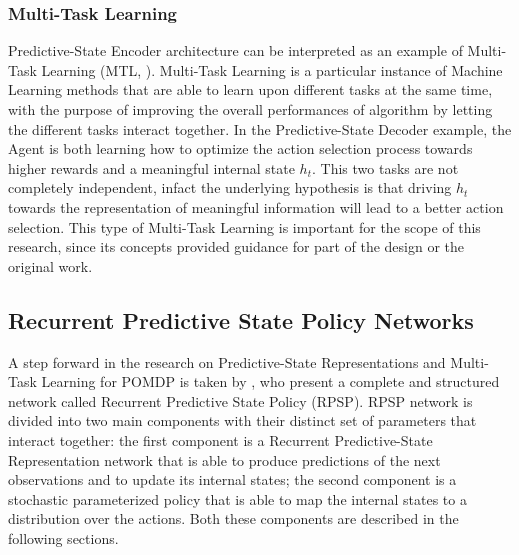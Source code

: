             \subsubsection{Multi-Task Learning}
                Predictive-State Encoder architecture can be interpreted as an example of Multi-Task Learning (MTL, ). Multi-Task Learning is a particular instance of Machine Learning methods that are able to learn upon different tasks at the same time, with the purpose of improving the overall performances of algorithm by letting the different tasks interact together. In the Predictive-State Decoder example, the Agent is both learning how to optimize the action selection process towards higher rewards and a meaningful internal state $h_t$. This two tasks are not completely independent, infact the underlying hypothesis is that driving $h_t$ towards the representation of meaningful information will lead to a better action selection. This type of Multi-Task Learning is important for the scope of this research, since its concepts provided guidance for part of the design or the original work.
        
        \newpage
        \subsection{Recurrent Predictive State Policy Networks}
        \label{subs:rpsp}
            A step forward in the research on Predictive-State Representations and Multi-Task Learning for POMDP is taken by , who present a complete and structured network called Recurrent Predictive State Policy (RPSP). \newline
            RPSP network is divided into two main components with their distinct set of parameters that interact together: the first component is a Recurrent Predictive-State Representation network that is able to produce predictions of the next observations and to update its internal states; the second component is a stochastic parameterized policy that is able to map the internal states to a distribution over the actions. Both these components are described in the following sections.
            
